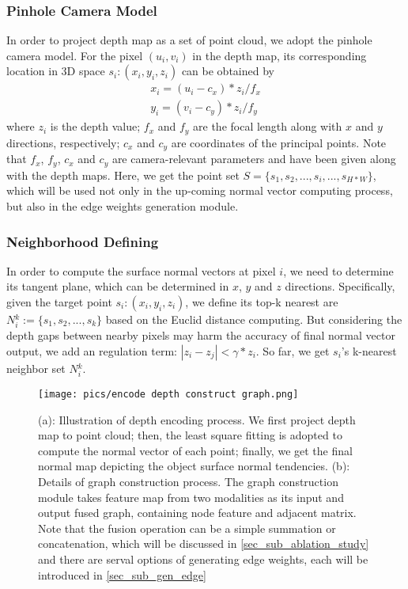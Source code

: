 ﻿\documentclass[journal]{IEEEtran}
\begin{document}
    \subsubsection{Pinhole Camera Model}  In order to project depth map as a set of point cloud, we adopt the pinhole camera model. For the pixel $(u_{i},v_{i})$ in the depth map, its corresponding location in 3D space $\mathit{s_{i}}:(x_{i},y_{i},z_{i})$ can be obtained by
    \begin{equation}
        \begin{split}
        x_{i} = (u_{i} - c_{x})*z_{i}/f_{x}\\
        y_{i} = (v_{i} - c_{y})*z_{i}/f_{y}
        \end{split}
    \end{equation}
    where $z_{i}$ is the depth value; $f_{x}$ and $f_{y}$ are the focal length along with $x$ and $y$ directions, respectively; $c_{x}$ and $c_{y}$ are coordinates of the principal points. Note that $f_{x}$, $f_{y}$, $c_{x}$ and $c_{y}$ are camera-relevant parameters and have been given along with the depth maps. Here, we get the point set ${S}=\{ {s_{1}}, {s_{2}}, ..., {s_{i}} , ...  , {s_{H*W}} \}$, which will be used not only in the up-coming normal vector computing process, but also in the edge weights generation module. 
    
 
    \subsubsection{Neighborhood Defining}  In order to compute the surface normal vectors at pixel $i$, we need to determine its tangent plane, which can be determined in $x$, $y$ and $z$ directions. Specifically, given the target point ${s_{i}}:(x_{i},y_{i},z_{i})$, we define its top-k nearest are $N{_i^k}:=  \{ s_{1}, s_{2}, ..., s_k\}$ based on the Euclid distance computing. But considering the depth gaps between nearby pixels may harm the accuracy of final normal vector output, we add an regulation term: $ |z_{i} - z_{j} | < \gamma *z_{i} $. So far, we get ${s_{i}}$'s k-nearest neighbor set $N{_i^k}$. 
    
    \begin{figure*}
        \centering
        \texttt{[image: pics/encode depth construct graph.png]}
        \caption{(a): Illustration of depth encoding process. We first project depth map to point cloud; then, the least square fitting is adopted to compute the normal vector of each point; finally, we get the final normal map depicting the object surface normal tendencies. (b): Details of graph construction process. The graph construction module takes feature map from two modalities as its input and output fused graph, containing node feature and adjacent matrix. Note that the fusion operation can be a simple summation or concatenation, which will be discussed in \ref{sec_sub_ablation_study} and there are serval options of generating edge weights, each will be introduced in \ref{sec_sub_gen_edge} }
        \label{fig_depth_encoding_and_graph_construction}
    \end{figure*}
 
\end{document}
